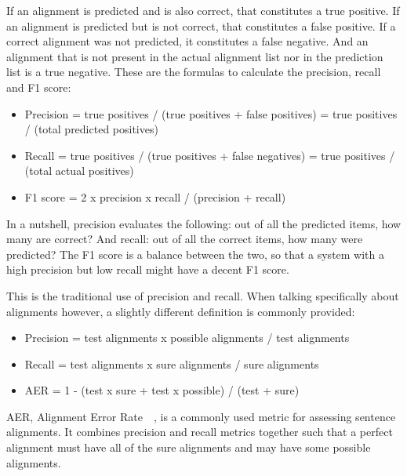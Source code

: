 If an alignment is predicted and is also correct, that constitutes a true positive. If an alignment is predicted but is not correct, that constitutes a false positive. If a correct alignment was not predicted, it constitutes a false negative. And an alignment that is not present in the actual alignment list nor in the prediction list is a true negative. These are the formulas to calculate the precision, recall and F1 score:

\begin{itemize}
    \item Precision =  true positives / (true positives + false positives) = true positives / (total predicted positives)
    \item Recall =  true positives / (true positives + false negatives) = true positives / (total actual positives)
    \item F1 score = 2 x precision x recall / (precision + recall)
\end{itemize}

In a nutshell, precision evaluates the following: out of all the predicted items, how many are correct? And recall: out of all the correct items, how many were predicted? The F1 score is a balance between the two, so that a system with a high precision but low recall might have a decent F1 score.

This is the traditional use of precision and recall. When talking specifically about alignments however, a slightly different definition is commonly provided:

\begin{itemize}
    \item Precision =  test alignments x possible alignments / test alignments
    \item Recall =  test alignments x sure alignments / sure alignments
    \item AER = 1 - (test x sure + test x possible) / (test + sure)
\end{itemize}

AER, Alignment Error Rate~\cite{mihalcea2003evaluation}~\cite{koehn2009statistical}, is a commonly used metric for assessing sentence alignments. It combines precision and recall metrics together such that a perfect alignment must have all of the sure alignments and may have some possible alignments.
